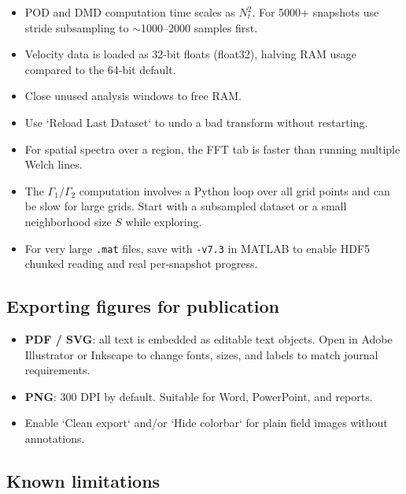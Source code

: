 \begin{itemize}[leftmargin=1.5em]
  \item POD and DMD computation time scales as $N_t^2$. For 5000+ snapshots use stride subsampling to $\sim$1000--2000 samples first.
  \item Velocity data is loaded as 32-bit floats (float32), halving RAM usage compared to the 64-bit default.
  \item Close unused analysis windows to free RAM.
  \item Use `Reload Last Dataset` to undo a bad transform without restarting.
  \item For spatial spectra over a region, the FFT tab is faster than running multiple Welch lines.
  \item The $\Gamma_1/\Gamma_2$ computation involves a Python loop over all grid points and can be slow for large grids. Start with a subsampled dataset or a small neighborhood size $S$ while exploring.
  \item For very large \texttt{.mat} files, save with \texttt{-v7.3} in MATLAB to enable HDF5 chunked reading and real per-snapshot progress.
\end{itemize}

\subsection{Exporting figures for publication}

\begin{itemize}[leftmargin=1.5em]
  \item \textbf{PDF / SVG}: all text is embedded as editable text objects. Open in Adobe Illustrator or Inkscape to change fonts, sizes, and labels to match journal requirements.
  \item \textbf{PNG}: 300 DPI by default. Suitable for Word, PowerPoint, and reports.
  \item Enable `Clean export` and/or `Hide colorbar` for plain field images without annotations.
\end{itemize}

\subsection{Known limitations}

